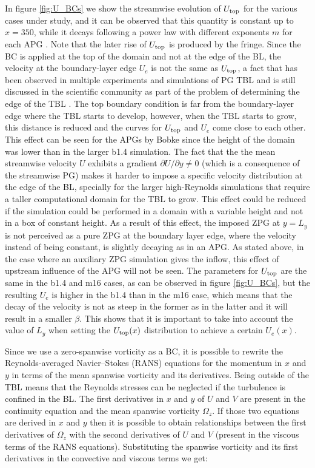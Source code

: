  In figure \ref{fig:U_BCs} we show the streamwise evolution of $U_{\rm top}$ for the various cases under study, and it can be observed that this quantity is constant up to $x=350$, while it decays following a power law with different exponents $m$ for each APG \citep{bobke2017}. Note that the later rise of $U_{\rm top}$ is produced by the fringe.
 Since the BC is applied at the top of the domain and not at the edge of the BL, the velocity at the boundary-layer edge $U_e$ is not the same as $U_{\rm top}$, a fact that has been observed in multiple experiments and simulations of PG TBL and is still discussed in the scientific community as part of the problem of determining the edge of the TBL \citep{diagnostic_Vinuesa, d99_determination_2020}. The top boundary condition is far from the boundary-layer edge where the TBL  starts to develop, however, when the TBL starts to grow, this distance is reduced and the curves for $U_{\rm top}$ and $U_{e}$ come close to each other. This effect can be seen for the APGs by Bobke since the height of the domain was lower than in the larger b1.4 simulation.
 The fact that the the mean streamwise velocity $U$ exhibits a gradient ${\partial U}/{\partial y} \neq 0$ (which is a consequence of the streamwise PG) makes it harder to impose a specific velocity distribution at the edge of the BL, specially for the larger high-Reynolds simulations that require a taller computational domain for the TBL to grow. This effect could be reduced if the simulation could be performed in a domain with a variable height and not in a box of constant height.
 As a result of this effect, the imposed ZPG at $y=L_y$ is not perceived as a pure ZPG at the boundary layer edge, where the velocity instead of being constant, is slightly decaying as in an APG. As stated above, in the case where an auxiliary ZPG simulation gives the inflow, this effect of upstream influence of the APG will not be seen.
 The parameters for $U_{\rm top}$ are the same in the b1.4 and m16 cases, as can be observed in figure \ref{fig:U_BCs}, but the resulting $U_{e}$ is higher in the b1.4 than in the m16 case, which means that the decay of the velocity is not as steep in the former as in the latter and it will result in a smaller $\beta$. This shows that it is important to take into account the value of $L_y$ when setting the $U_{\rm top}(x)$ distribution to achieve a certain $U_{e}(x)$. 
 
Since we use a zero-spanwise vorticity as a BC, it is possible to rewrite the Reynolds-averaged Navier--Stokes (RANS) equations for the momentum in $x$ and $y$ in terms of the mean spanwise vorticity and its derivatives.
Being outside of the TBL means that the Reynolds stresses can be neglected if the turbulence is confined in the BL.
The first derivatives in $x$ and $y$ of $U$ and $V$ are present in the continuity equation and the mean spanwise vorticity $\Omega_z$. If those two equations are derived in $x$ and $y$ then it is possible to obtain relationships between the first derivatives of $\Omega_z$ with the second derivatives of $U$ and $V$ (present in the viscous terms of the RANS equations). Substituting the spanwise vorticity and its first derivatives in the convective and viscous terms we get:

